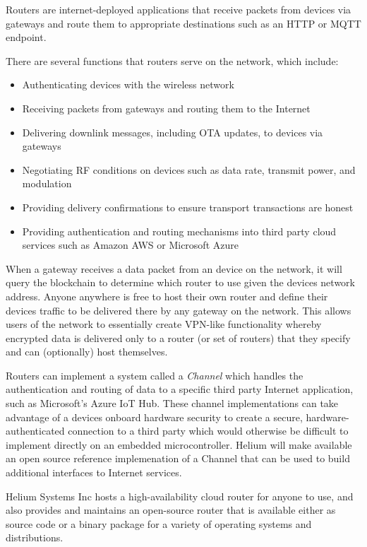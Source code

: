 \documentclass[letterpaper,11pt]{article}
\begin{document}
Routers are internet-deployed applications that receive packets from devices via gateways and route them to appropriate destinations such as an HTTP or MQTT endpoint.\newline

There are several functions that routers serve on the network, which include:

\begin{itemize}
	\item Authenticating devices with the wireless network
	\item Receiving packets from gateways and routing them to the Internet
	\item Delivering downlink messages, including OTA updates, to devices via gateways
	\item Negotiating RF conditions on devices such as data rate, transmit power, and modulation
	\item Providing delivery confirmations to ensure transport transactions are honest
	\item Providing authentication and routing mechanisms into third party cloud services such as Amazon AWS or Microsoft Azure
\end{itemize}

When a gateway receives a data packet from an device on the network, it will query the blockchain to determine which router to use given the devices network address. Anyone anywhere is free to host their own router and define their devices traffic to be delivered there by any gateway on the network. This allows users of the network to essentially create VPN-like functionality whereby encrypted data is delivered only to a router (or set of routers) that they specify and can (optionally) host themselves.\newline

Routers can implement a system called a \textit{Channel} which handles the authentication and routing of data to a specific third party Internet application, such as Microsoft's Azure IoT Hub\cite{azure}. These channel implementations can take advantage of a devices onboard hardware security to create a secure, hardware-authenticated connection to a third party which would otherwise be difficult to implement directly on an embedded microcontroller. Helium will make available an open source reference implemenation of a Channel that can be used to build additional interfaces to Internet services.\newline

Helium Systems Inc hosts a high-availability cloud router for anyone to use, and also provides and maintains an open-source router that is available either as source code or a binary package for a variety of operating systems and distributions.\newline
\end{document}
